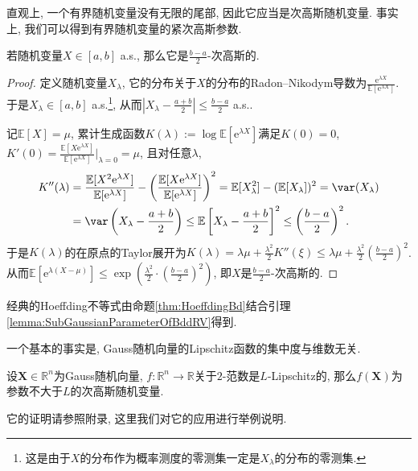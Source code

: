 直观上, 一个有界随机变量没有无限的尾部, 因此它应当是次高斯随机变量. 
事实上, 我们可以得到有界随机变量的紧次高斯参数. 
\begin{lemma}[有界随机变量]\label{lemma:SubGaussianParameterOfBddRV}
	若随机变量$X \in [a, b]$ a.s., 那么它是$\frac{b-a}{2}$-次高斯的. 
\end{lemma}
\begin{proof}
	定义随机变量$X_{\lambda}$, 它的分布关于$X$的分布的Radon–Nikodym导数为$\frac{\mathrm{e}^{\lambda X}}{\mathbb{E}[\mathrm{e}^{\lambda X}]}$. 
	于是$X_{\lambda} \in [a, b]$ a.s.\footnote{这是由于$X$的分布作为概率测度的零测集一定是$X_{\lambda}$的分布的零测集.}, 从而$\left|X_{\lambda} - \frac{a+b}{2} \right| \leq \frac{b-a}{2}$ a.s..
	
	记$\mathbb{E}[X] = \mu$, 累计生成函数$K(\lambda) := \log \mathbb{E}[\mathrm{e}^{\lambda X}]$满足$K(0) = 0$, $K'(0) = \frac{\mathbb{E}[X \mathrm{e}^{\lambda X}]}{\mathbb{E}[\mathrm{e}^{\lambda X}]} \big|_{\lambda = 0} = \mu$, 且对任意$\lambda$, 
	\begin{align*}
		K''(\lambda) 
		&= \frac{\mathbb{E}[X^2 \mathrm{e}^{\lambda X}]}{\mathbb{E}[\mathrm{e}^{\lambda X}]} - \left( \frac{\mathbb{E}[X \mathrm{e}^{\lambda X}]}{\mathbb{E}[\mathrm{e}^{\lambda X}]} \right)^2
		= \mathbb{E}[X_{\lambda}^2] - (\mathbb{E}[X_{\lambda}])^2
		= \var (X_{\lambda})\\
		&= \var \left(X_{\lambda} - \frac{a+b}{2} \right) 
		\leq \mathbb{E}\left[X_{\lambda} - \frac{a+b}{2} \right]^2 
		\leq \left(\frac{b-a}{2}\right)^2.  
	\end{align*} 
	于是$K(\lambda)$的在原点的Taylor展开为$K(\lambda) = \lambda \mu + \frac{\lambda^2}{2} K''(\xi) \leq \lambda \mu + \frac{\lambda^2}{2} \left(\frac{b-a}{2}\right)^2$. 
	从而$\mathbb{E}[\mathrm{e}^{\lambda(X - \mu)}] \leq \exp\left(\frac{\lambda^2}{2} \cdot \left(\frac{b-a}{2}\right)^2\right)$, 即$X$是$\frac{b-a}{2}$-次高斯的. 
\end{proof}

\begin{corollary}
	经典的Hoeffding不等式由命题\ref{thm:HoeffdingBd}结合引理\ref{lemma:SubGaussianParameterOfBddRV}得到. 
\end{corollary}

一个基本的事实是, Gauss随机向量的Lipschitz函数的集中度与维数无关. 
\begin{theorem}\label{thm:LipOfGaussianIsDimFree}
	设$\bm{X} \in \mathbb{R}^n$为Gauss随机向量, $f \colon \mathbb{R}^n \to \mathbb{R}$关于$2$-范数是$L$-Lipschitz的, 那么$f(\bm{X})$为参数不大于$L$的次高斯随机变量. 
\end{theorem}
它的证明请参照附录, 这里我们对它的应用进行举例说明. 

